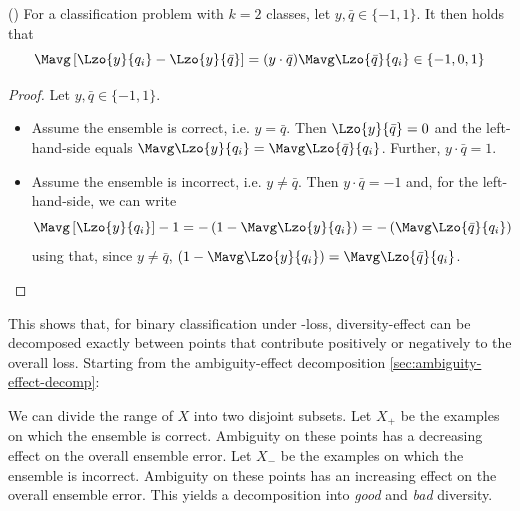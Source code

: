 \documentclass[../main.tex]{subfiles}
\begin{document}
\begin{lemma} (\cite{kuncheva})
For a classification problem with $k=2$ classes, let $y, \bar{q} \in \{ -1, 1 \}$. It then holds that
$$
\Mavg \left[\Lzo{y}{q_{i}} - \Lzo{y}{\bar{q}}\right] 
= (y \cdot \bar{q}) \Mavg \Lzo{\bar{q}}{q_{i}} \in \{-1, 0, 1\}
$$
\end{lemma}
\begin{proof} Let $y, \bar{q} \in \{ -1, 1 \}$.
\begin{itemize}
\item Assume the ensemble is correct, i.e. $y=\bar{q}$. Then $\Lzo{y}{\bar{q}} = 0$ and the left-hand-side equals $\Mavg\Lzo{y}{q_{i}} = \Mavg\Lzo{\bar{q}}{q_{i}}$. Further, $y \cdot \bar{q} = 1$.
\item Assume the ensemble is incorrect, i.e. $y \not= \bar{q}$. Then $y \cdot \bar{q} = -1$ and, for the left-hand-side, we can write
$$
\Mavg \left[\Lzo{y}{q_{i}}\right] - 1 = - \left(1 - \Mavg \Lzo{y}{q_{i}}\right) = - \left(\Mavg \Lzo{\bar{q}}{q_{i}} \right)
$$
using that, since $y \not= \bar{q}$, $\left(  1 - \Mavg \Lzo{y}{q_{i}}\right) = \Mavg \Lzo{\bar{q}}{q_{i}}$.
\end{itemize}
\end{proof}
This shows that, for binary classification under \zeroone-loss, diversity-effect can be decomposed exactly between points that contribute positively or negatively to the overall loss.
 Starting from the 
ambiguity-effect decomposition \ref{sec:ambiguity-effect-decomp}:

We can divide the range of $X$ into two disjoint subsets. Let $X_{+}$ be the examples on which the ensemble is correct. Ambiguity on these points has a decreasing effect on the overall ensemble error. Let $X_{-}$ be the examples on which the ensemble is incorrect. Ambiguity on these points has an increasing effect on the overall ensemble error. This yields a decomposition into \textit{good} and \textit{bad} diversity.
\end{document}

